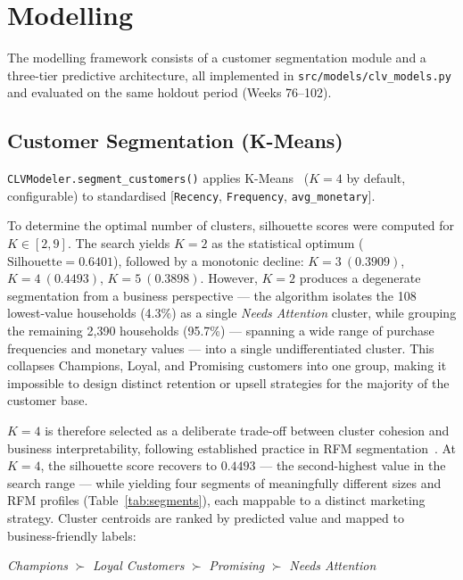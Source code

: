 \documentclass[conference]{IEEEtran}
\begin{document}
\section{Modelling}
\label{sec:model}

The modelling framework consists of a customer segmentation module and a three-tier predictive architecture, all implemented in \texttt{src/models/clv\_models.py} and evaluated on the same holdout period (Weeks 76--102).

\subsection{Customer Segmentation (K-Means)}

\texttt{CLVModeler.segment\_customers()} applies K-Means~\cite{pedregosa2011}
($K{=}4$ by default, configurable) to standardised
[\texttt{Recency}, \texttt{Frequency}, \texttt{avg\_monetary}].

To determine the optimal number of clusters, silhouette scores were computed for $K \in [2, 9]$. The search yields $K=2$ as the statistical optimum ($\text{Silhouette} = 0.6401$), followed by a monotonic decline: $K=3\ (0.3909)$, $K=4\ (0.4493)$, $K=5\ (0.3898)$. However, $K=2$ produces a degenerate segmentation from a business perspective --- the algorithm isolates the 108 lowest-value households (4.3\%) as a single \textit{Needs Attention} cluster, while grouping the remaining 2,390 households (95.7\%) --- spanning a wide range of purchase frequencies and monetary values --- into a single undifferentiated cluster. This collapses Champions, Loyal, and Promising customers into one group, making it impossible to design distinct retention or upsell strategies for the majority of the customer base.

$K=4$ is therefore selected as a deliberate trade-off between cluster cohesion and business interpretability, following established practice in RFM segmentation~\cite{hughes1994}. At $K=4$, the silhouette score recovers to $0.4493$ --- the second-highest value in the search range --- while yielding four segments of meaningfully different sizes and RFM profiles (Table~\ref{tab:segments}), each mappable to a distinct marketing strategy. Cluster centroids are ranked by predicted value and mapped to
business-friendly labels:

\begin{center}
  \textit{Champions} $\succ$ \textit{Loyal Customers}
  $\succ$ \textit{Promising} $\succ$ \textit{Needs Attention}
\end{center}
\end{document}
